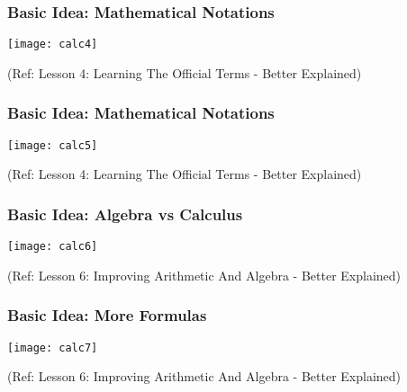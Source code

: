  \begin{frame}[fragile]\frametitle{Basic Idea: Mathematical Notations}
 
\begin{center}
\texttt{[image: calc4]}
\end{center}

\tiny{(Ref: Lesson 4: Learning The Official Terms - Better Explained)}
\end{frame}

 \begin{frame}[fragile]\frametitle{Basic Idea: Mathematical Notations}
 
\begin{center}
\texttt{[image: calc5]}
\end{center}

\tiny{(Ref: Lesson 4: Learning The Official Terms - Better Explained)}
\end{frame}

 \begin{frame}[fragile]\frametitle{Basic Idea: Algebra vs Calculus}
 
\begin{center}
\texttt{[image: calc6]}
\end{center}

\tiny{(Ref: Lesson 6: Improving Arithmetic And Algebra - Better Explained)}
\end{frame}

 \begin{frame}[fragile]\frametitle{Basic Idea: More Formulas}
 
\begin{center}
\texttt{[image: calc7]}
\end{center}

\tiny{(Ref: Lesson 6: Improving Arithmetic And Algebra - Better Explained)}
\end{frame}